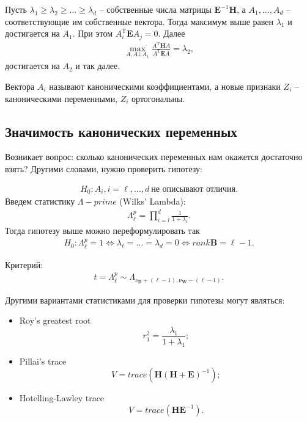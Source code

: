 \documentclass{article}
\begin{document}
	Пусть $\lambda_1 \geq \lambda_2 \geq \ldots \geq \lambda_d$ -- собственные числа матрицы $\mathbf{E}^{-1}\mathbf{H}$, а $A_1, \ldots, A_d$ -- соответствующие им собственные вектора. Тогда максимум выше равен $\lambda_1$  и достигается на $A_1$. При этом $A^\mathrm{T}_i \mathbf{E}A_j = 0$. Далее
	\begin{align*}
		\max_{A, A \bot A_1}\frac{A^\mathrm{T}\mathbf{H}A}{A^\mathrm{T}\mathbf{E}A} = \lambda_2,
	\end{align*}
	достигается на $A_2$ и так далее.
	
	Вектора $A_i$ называют каноническими коэффициентами, а новые признаки $Z_i$ -- каноническими переменными, $Z_i$ ортогональны.
	
	\subsection{Значимость канонических переменных}
	
	Возникает вопрос: сколько канонических переменных нам окажется достаточно взять? Другими словами, нужно проверить гипотезу:
	
	\begin{align*}
		H_0: A_i, i = \ell,\ldots,d~\text{не описывают отличия}.
	\end{align*}
	Введем статистику $\Lambda-prime$ (Wilks' Lambda):
	\begin{align*}
		\Lambda_\ell^p = \prod_{i = l}^d \frac{1}{1 + \lambda_i}.
	\end{align*}
	Тогда гипотезу выше можно переформулировать так
	\begin{align*}
		H_0: \Lambda_\ell^p = 1 \Leftrightarrow \lambda_\ell = \ldots = \lambda_d = 0 \Leftrightarrow rank \mathbf{B} = \ell - 1.
	\end{align*}
	
	Критерий:
	\begin{align*}
		t = \Lambda_{\ell}^{p} \sim \Lambda_{\nu_\mathbf{B} + (\ell - 1), \nu_\mathbf{W} - (\ell - 1)}.
	\end{align*}
	
	Другими вариантами статистиками для проверки гипотезы могут являться:
	\begin{itemize}
	\item Roy's greatest root $$r_1^2 = \frac{\lambda_1}{1+\lambda_1};$$
	
	\item Pillai's trace $$V=trace(\mathbf H(\mathbf H + \mathbf E)^{-1});$$
	
	\item Hotelling-Lawley trace $$V=trace(\mathbf H \mathbf E^{-1}).$$
	\end{itemize}
	
\end{document}

